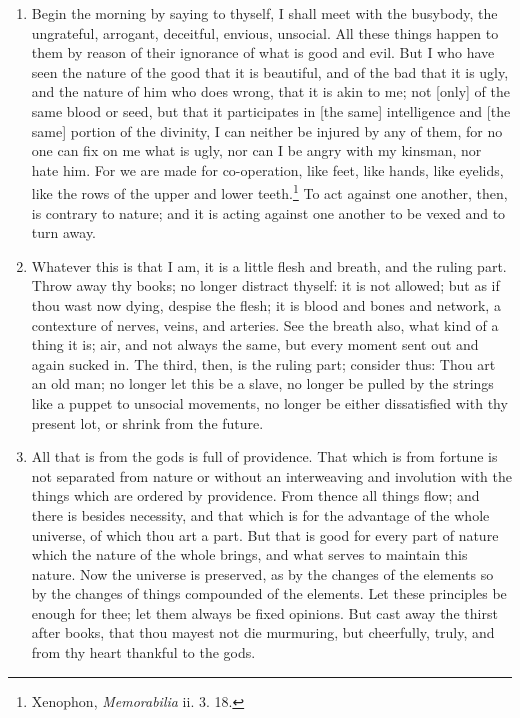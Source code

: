 \begin{enumerate}
\item Begin the morning by saying to thyself, I shall meet with the busybody, the ungrateful, arrogant, deceitful, envious, unsocial. All these things happen to them by reason of their ignorance of what is good and evil. But I who have seen the nature of the good that it is beautiful, and of the bad that it is ugly, and the nature of him who does wrong, that it is akin to me; not [{\clarify only}] of the same blood or seed, but that it participates in [{\clarify the same}] intelligence and [{\clarify the same}] portion of the divinity, I can neither be injured by any of them, for no one can fix on me what is ugly, nor can I be angry with my kinsman, nor hate him. For we are made for co-operation, like feet, like hands, like eyelids, like the rows of the upper and lower teeth.\footnote{Xenophon, \textit{Memorabilia} ii. 3. 18.} To act against one another, then, is contrary to nature; and it is acting against one another to be vexed and to turn away.

\item Whatever this is that I am, it is a little flesh and breath, and the ruling part. Throw away thy books; no longer distract thyself: it is not allowed; but as if thou wast now dying, despise the flesh; it is blood and bones and network, a contexture of nerves, veins, and arteries. See the breath also, what kind of a thing it is; air, and not always the same, but every moment sent out and again sucked in. The third, then, is the ruling part; consider thus: Thou art an old man; no longer let this be a slave, no longer be pulled by the strings like a puppet to unsocial movements, no longer be either dissatisfied with thy present lot, or shrink from the future.

\item All that is from the gods is full of providence. That which is from fortune is not separated from nature or without an interweaving and involution with the things which are ordered by providence. From thence all things flow; and there is besides necessity, and that which is for the advantage of the whole universe, of which thou art a part. But that is good for every part of nature which the nature of the whole brings, and what serves to maintain this nature. Now the universe is preserved, as by the changes of the elements so by the changes of things compounded of the elements. Let these principles be enough for thee; let them always be fixed opinions. But cast away the thirst after books, that thou mayest not die murmuring, but cheerfully, truly, and from thy heart thankful to the gods.


\end{enumerate}

